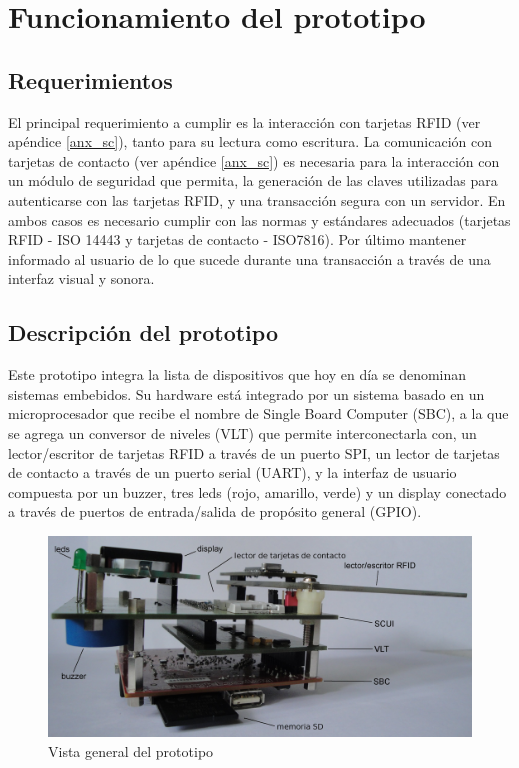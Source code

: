 \chapter{Funcionamiento del prototipo}

\section{Requerimientos}
El principal requerimiento a cumplir es la interacción con tarjetas RFID (ver apéndice \ref{anx_sc}), tanto para su lectura como escritura.
La comunicación con tarjetas de contacto (ver apéndice \ref{anx_sc}) es necesaria para la interacción con un módulo de seguridad que permita, la generación de las claves utilizadas para autenticarse con las tarjetas RFID, y una transacción segura con un servidor. En ambos casos es necesario cumplir con las normas y estándares adecuados  (tarjetas RFID - ISO 14443 y tarjetas de contacto - ISO7816).
Por último mantener informado al usuario de lo que sucede durante una transacción a través de una interfaz visual y sonora.


\section{Descripción del prototipo}
Este prototipo integra la lista de dispositivos que hoy en día se denominan sistemas embebidos. Su hardware está integrado por un sistema basado en un microprocesador que  recibe el nombre de Single Board Computer (SBC), a la que se agrega un conversor de niveles (VLT) que permite interconectarla con, un lector/escritor de tarjetas RFID a través de un puerto SPI, un lector de tarjetas de contacto a través de un puerto serial (UART), y la interfaz de usuario compuesta por un buzzer, tres leds (rojo, amarillo, verde) y un display conectado a través de puertos de entrada/salida de propósito general (GPIO).

\begin{figure}[H]
\centering
  \begin{center}
   \includegraphics[scale=.15]{Imagenes/prototipo_s_nombres.jpg}
  \end{center}
  \caption{Vista general del prototipo}\label{prototipo} 
\end{figure}

